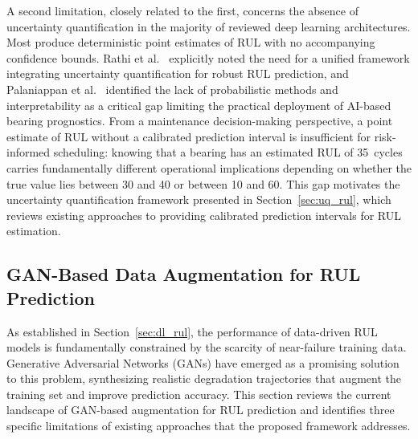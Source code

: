 A second limitation, closely related to the first, concerns the
absence of uncertainty quantification in the majority of reviewed deep
learning architectures. Most produce deterministic point estimates of
RUL with no accompanying confidence bounds.
Rathi et al.~\cite{rathi2026reliability} explicitly noted the need
for a unified framework integrating uncertainty quantification for
robust RUL prediction, and
Palaniappan et al.~\cite{palaniappan_systematic_2026} identified the
lack of probabilistic methods and interpretability as a critical gap
limiting the practical deployment of AI-based bearing prognostics.
From a maintenance decision-making perspective, a point estimate of
RUL without a calibrated prediction interval is insufficient for
risk-informed scheduling: knowing that a bearing has an estimated
RUL of 35~cycles carries fundamentally different operational
implications depending on whether the true value lies between 30 and
40 or between 10 and 60. This gap motivates the uncertainty quantification
framework presented in Section~\ref{sec:uq_rul}, which
reviews existing approaches to providing calibrated prediction
intervals for RUL estimation.



\subsection{GAN-Based Data Augmentation for RUL Prediction}
\label{sec:gan_augmentation}

As established in Section~\ref{sec:dl_rul}, the performance of
data-driven RUL models is fundamentally constrained by the scarcity
of near-failure training data. Generative Adversarial Networks (GANs)
have emerged as a promising solution to this problem, synthesizing
realistic degradation trajectories that augment the training set and
improve prediction accuracy. This section reviews the current
landscape of GAN-based augmentation for RUL prediction and identifies
three specific limitations of existing approaches that the proposed
framework addresses.\\

